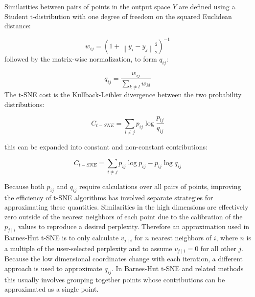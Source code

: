 \documentclass[12pt]{article}
\begin{document}
Similarities between pairs of points in the output space $Y$ are defined using a Student t-distribution with one degree of freedom on the squared Euclidean distance:

\begin{equation}\label{weight_tdist}
    w_{ij} = \left(1 + \left\lVert y_i - y_j \right\rVert_2^2 \right) ^ {-1}
\end{equation}
followed by the matrix-wise normalization, to form $q_{ij}$:

\begin{equation}
    q_{ij} = \frac{w_{ij}}{\sum_{k \neq l} w_{kl}} 
\end{equation}
The t-SNE cost is the Kullback-Leibler divergence between the two probability distributions:

\begin{equation}
    C_{t-SNE} = \sum_{i \neq j} p_{ij} \log \frac{p_{ij}}{q_{ij}}
\end{equation}

this can be expanded into constant and non-constant contributions:

\begin{equation}
    C_{t-SNE} = \sum_{i \neq j} p_{ij} \log {p_{ij}}
    -  p_{ij} \log {q_{ij}}
\end{equation}

Because both $p_{ij}$ and $q_{ij}$ require calculations over all pairs of points, improving the efficiency of t-SNE algorithms has involved separate strategies for approximating these quantities. Similarities in the high dimensions are effectively zero outside of the nearest neighbors of each point due to the calibration of the $p_{j \mid i}$ values to reproduce a desired perplexity. Therefore an approximation used in Barnes-Hut t-SNE is to only calculate $v_{j \mid i}$ for $n$ nearest neighbors of $i$, where $n$ is a multiple of the user-selected perplexity and to assume $v_{j \mid i} = 0$ for all other $j$. Because the low dimensional coordinates change with each iteration, a different approach is used to approximate $q_{ij}$. In Barnes-Hut t-SNE and related methods this usually involves grouping together points whose contributions can be approximated as a single point.
\end{document}
